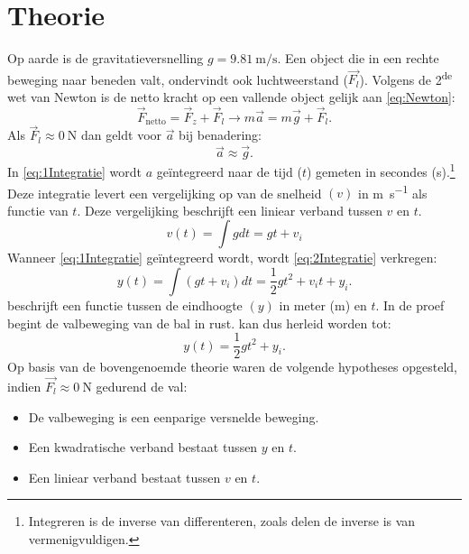 \documentclass{scrartcl}
\begin{document}
\section{Theorie}
Op aarde is de gravitatieversnelling $g=\SI{9.81}{\meter\per\second}$. Een object die in een rechte beweging naar beneden valt, ondervindt ook luchtweerstand ($\vec{F_{l}}$). Volgens de 2\textsuperscript{de} wet van Newton is de netto kracht op een vallende object gelijk aan \cref{eq:Newton}:
\begin{equation}\label{eq:Newton}
\vec{F}_{\mathrm{netto}}=\vec{F}_{z}+\vec{F}_{l} \rightarrow
m\vec{a}=m\vec{g}+\vec{F}_{l}\mathrm{.}
\end{equation}
Als $\vec{F}_{l} \approx \SI{0}{\newton}$ dan geldt voor $\vec{a}$ bij benadering:
\begin{equation*}
\vec{a}\approx \vec{g}\mathrm{.}
\end{equation*}
In \cref{eq:1Integratie} wordt $a$ geïntegreerd naar de tijd ($t$) gemeten in secondes (\si{\second}).\footnote{Integreren is de inverse van differenteren, zoals delen de inverse is van vermenigvuldigen.} Deze integratie levert een vergelijking op van de snelheid $(v)$ in \si{\meter\per\second} als functie van $t$. Deze vergelijking beschrijft een liniear verband tussen $v$ en $t$.
\begin{equation}\label{eq:1Integratie}
v(t)=\int g dt= gt + v_i
\end{equation}
Wanneer \cref{eq:1Integratie} ge\"{i}ntegreerd wordt, wordt \eqref{eq:2Integratie} verkregen:
\begin{equation}\label{eq:2Integratie}
y(t)=\int (gt + v_i)dt =\frac{1}{2}gt^2+v_{i}t+y_i\mathrm{.}
\end{equation}
 beschrijft een functie tussen de eindhoogte $(y)$ in meter (\si{\meter}) en $t$. In de proef begint de valbeweging van de bal in rust.  kan dus herleid worden tot:
\begin{equation*}
y(t)=\frac{1}{2}gt^2+y_i\mathrm{.}
\end{equation*}
Op basis van de bovengenoemde theorie waren de volgende hypotheses opgesteld, indien $\vec{F_{l}} \approx \SI{0}{\newton}$ gedurend de val:
\begin{itemize}
 \renewcommand{\labelitemi}{\scriptsize$\blacksquare$}
\item De valbeweging is een eenparige versnelde beweging.
\item Een kwadratische verband bestaat tussen $y$ en $t$.
\item Een liniear verband bestaat tussen $v$ en $t$.
\end{itemize}
%
\end{document}
